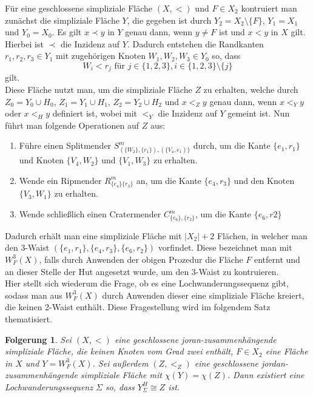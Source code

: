 \documentclass[12pt,titlepage]{article}
\newtheorem{folgerung}{Folgerung}[section]
\begin{document}
Für eine geschlossene simpliziale Fläche $(X,<)$ und $F \in X_2$ kontruiert man zunächst die simpliziale Fläche $Y$, die gegeben ist durch $Y_2=X_2\setminus \{F\}$, $Y_1=X_1$ und $Y_0=X_0$. Es gilt $x\prec y$ in $Y$ genau dann, wenn $y\neq F$ ist und $x<y$ in $X$ gilt. Hierbei ist $\prec$ die Inzidenz auf $Y$. Dadurch entstehen die Randkanten $r_1,r_2,r_3 \in Y_1$ mit zugehörigen Knoten $W_1,W_2,W_3\in Y_0$ so, dass 
\[
W_i < r_j \text{ für } j\in \{1,2,3\},i\in\{1,2,3\}\setminus \{j\}
\] gilt.\\
Diese Fläche nutzt man, um die simpliziale Fläche $Z$ zu erhalten, welche durch $Z_0=Y_0 \cup H_0$, $Z_1=Y_1 \cup H_1$, $Z_2=Y_2 \cup H_2$ und $x<_Z y$ genau dann, wenn $x <_Y y$ oder $x <_H y$ definiert ist, wobei mit $<_Y$ die Inzidenz auf $Y$ gemeint ist. Nun führt man folgende Operationen auf $Z$ aus:
\begin{enumerate}
\item Führe einen Splitmender $S^m_{(\{W_2\},\{r_1\}),(\{V_4,e_1)\}}$ durch, um die Kante $\{e_1,r_1\}$ und Knoten $\{V_4,W_2\}$ und $\{V_1,W_3\}$ zu erhalten.
\item Wende ein Ripmender $R^m_{\{e_4\}\{r_3\}}$ an, um die Kante $\{e_4,r_3\}$ und den Knoten $\{V_3,W_1\}$ zu erhalten. 
\item Wende schließlich einen Cratermender $C^m_{\{e_6\},\{r_2\}}$, um die Kante $\{e_6,r2\}$
\end{enumerate}
Dadurch erhält man eine simpliziale Fläche mit $\vert X_2\vert +2$ Flächen, in welcher man den 3-Waist $(\{e_1,r_1\},\{e_4,r_3\},\{e_6,r_2\})$ vorfindet. Diese bezeichnet man mit \emph{$W_F^3(X)$}, falls durch Anwenden der obigen Prozedur die Fläche $F$ entfernt und an dieser Stelle der Hut angesetzt wurde, um den 3-Waist zu kontruieren.\\
Hier stellt sich wiederum die Frage, ob es eine Lochwanderungssequenz gibt, sodass man aus $W_F^3(X)$ durch Anwenden dieser eine simpliziale Fläche kreiert, die keinen 2-Waist enthält. Diese Fragestellung wird im folgendem Satz thematisiert.
\begin{folgerung}
Sei $(X,<)$ eine geschlossene joran-zusammenhängende simpliziale Fläche, die keinen Knoten vom Grad zwei enthält, $F\in X_2$ eine Fläche in $X$ und $Y=W^3_F(X)$. Sei außerdem $(Z,<_Z)$ eine geschlossene jordan-zusammenhängende simpliziale Fläche mit $\chi(Y)=\chi(Z)$. Dann existiert eine Lochwanderungssequenz $\Sigma$ so, dass $Y_{\Sigma}^H \cong Z$ ist.
\end{folgerung}
\end{document}
